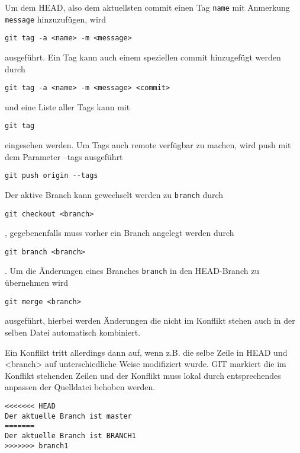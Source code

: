 \documentclass{scrartcl}
\begin{document}
\vspace{1.5\baselineskip}
Um dem HEAD, also dem aktuellsten commit einen Tag \texttt{name} mit Anmerkung \texttt{message} hinzuzufügen, wird 
\begin{lstlisting}
git tag -a <name> -m <message>
\end{lstlisting}
ausgeführt. Ein Tag kann auch einem speziellen commit hinzugefügt werden durch
\begin{lstlisting}
git tag -a <name> -m <message> <commit>
\end{lstlisting}
und eine Liste aller Tags kann mit
\begin{lstlisting}
git tag
\end{lstlisting}
eingesehen werden. Um Tags auch remote verfügbar zu machen, wird push mit dem Parameter --tags ausgeführt
\begin{lstlisting}
git push origin --tags
\end{lstlisting}

\vspace{1.5\baselineskip}
Der aktive Branch kann gewechselt werden zu \texttt{branch} durch
\begin{lstlisting}
git checkout <branch>
\end{lstlisting}
, gegebenenfalls muss vorher ein Branch angelegt werden durch
\begin{lstlisting}
git branch <branch>
\end{lstlisting}
. Um die Änderungen eines Branches \texttt{branch} in den HEAD-Branch zu übernehmen wird 
\begin{lstlisting}
git merge <branch>
\end{lstlisting}
ausgeführt, hierbei werden Änderungen die nicht im Konflikt stehen auch in der selben Datei automatisch kombiniert. 

Ein Konflikt tritt allerdings dann auf, wenn z.B. die selbe Zeile in HEAD und <branch> auf unterschiedliche Weise modifiziert wurde. GIT markiert die im Konflikt stehenden Zeilen und der Konflikt muss lokal durch entsprechendes anpassen der Quelldatei behoben werden.
\begin{lstlisting}
<<<<<<< HEAD
Der aktuelle Branch ist master
=======
Der aktuelle Branch ist BRANCH1
>>>>>>> branch1
\end{lstlisting}
\end{document}
